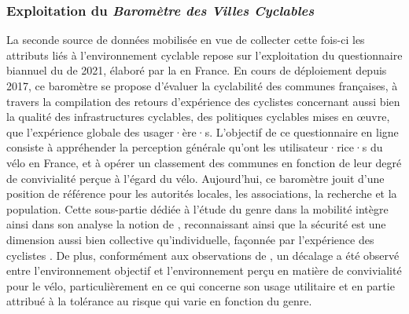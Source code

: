 \begin{refsegment}
\subsubsection*{Exploitation du \textsl{Baromètre des Villes Cyclables}
    \label{chap4:source-barometre-fub}
    }

La seconde source de données mobilisée en vue de collecter cette fois-ci les attributs liés à l'environnement cyclable repose sur l'exploitation du questionnaire biannuel du  de 2021, élaboré par la \textcolor{blue}{\textcite{fub_barometre_2021}} en France. En cours de déploiement depuis 2017, ce baromètre se propose d'évaluer la cyclabilité des communes françaises, à travers la compilation des retours d'expérience des cyclistes concernant aussi bien la qualité des infrastructures cyclables, des politiques cyclables mises en œuvre, que l'expérience globale des usager·ère·s. L'objectif de ce questionnaire en ligne consiste à appréhender la \gls{perception} générale qu'ont les utilisateur·rice·s du vélo en France, et à opérer un classement des communes en fonction de leur degré de convivialité perçue à l'égard du vélo. Aujourd'hui, ce baromètre jouit d'une position de référence pour les autorités locales, les associations, la recherche et la population. Cette sous-partie dédiée à l'étude du genre dans la mobilité intègre ainsi dans son analyse la notion de , reconnaissant ainsi que la sécurité est une dimension aussi bien collective qu'individuelle, façonnée par l'expérience des cyclistes \textcolor{blue}{\autocite[57]{garrard_promoting_2008}}. De plus, conformément aux observations de \textcolor{blue}{\textcite[303]{ma_peoples_2017}}, un décalage a été observé entre l'environnement objectif et l'environnement perçu en matière de convivialité pour le vélo, particulièrement en ce qui concerne son usage utilitaire et en partie attribué à la tolérance au risque qui varie en fonction du genre.%


\end{refsegment}
